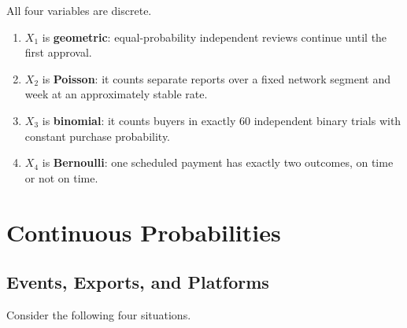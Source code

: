 	All four variables are discrete.
	\begin{enumerate}
		\item $X_1$ is \textbf{geometric}: equal-probability independent reviews continue until the first approval.
		\item $X_2$ is \textbf{Poisson}: it counts separate reports over a fixed network segment and week at an approximately stable rate.
		\item $X_3$ is \textbf{binomial}: it counts buyers in exactly $60$ independent binary trials with constant purchase probability.
		\item $X_4$ is \textbf{Bernoulli}: one scheduled payment has exactly two outcomes, on time or not on time.
	\end{enumerate}



	\section{Continuous Probabilities}
	\label{sec:continuous-probabilities}


	\subsection{Events, Exports, and Platforms}
	\label{sec:events-exports-platforms}

	Consider the following four situations.

